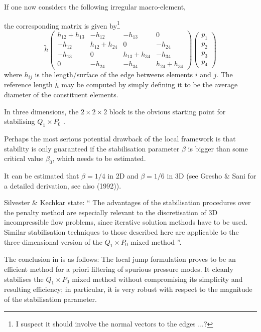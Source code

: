 If one now considers the following irregular macro-element,
\begin{center}

\end{center}
the corresponding matrix is given by\footnote{I suspect it should involve the normal vectors to the edges ...?}
\[
\tilde{h}
\left(
\begin{array}{cccc}
h_{12}+h_{13} & -h_{12} & -h_{13} & 0\\
-h_{12} & h_{12}+h_{24} & 0 & -h_{24} \\
-h_{13} & 0 & h_{13}+h_{34} & -h_{34} \\
0 & -h_{24} & -h_{34} & h_{24} + h_{34}
\end{array}
\right)
\left(
\begin{array}{c}
p_1 \\ p_2 \\ p_3 \\ p_4
\end{array}
\right)
\]
where $h_{ij}$ is the length/surface of the edge betweens elements $i$ and $j$. The reference length $\tilde{h}$ may be computed by simply defining it to be the average diameter of the constituent elements.


\begin{remark}
In three dimensions, the $2\times 2 \times 2$ block is the obvious starting point for stabilising $Q_1\times P_0$ \cite{grsa}.
\end{remark}


Perhaps the most serious potential drawback of the local framework is that stability is only guaranteed if the stabilisation parameter $\beta$ is bigger than some critical value $\beta_0$, which needs to be estimated.

It can be estimated that $\beta=1/4$ in 2D and $\beta=1/6$ in 3D (see Gresho \& Sani \cite[p636]{grsa} for a detailed derivation, see also \textcite{vibo92} (1992)).

Silvester \& Kechkar state: ``
The advantages of the stabilisation procedures over the penalty method
are especially relevant to the discretisation of 3D incompressible flow problems, since iterative solution methods have to be used.
Similar stabilisation techniques to those described here are applicable to the three-dimensional version of the $Q_1 \times P_0$ mixed method
''.

The conclusion in \cite{sike90} is as follows:
The local jump formulation proves to be an efficient method for a priori filtering of spurious pressure modes. It cleanly stabilises the $Q_1\times P_0$ mixed method without compromising
its simplicity and resulting efficiency; in particular, it is very robust with respect to the magnitude of the stabilisation parameter.

